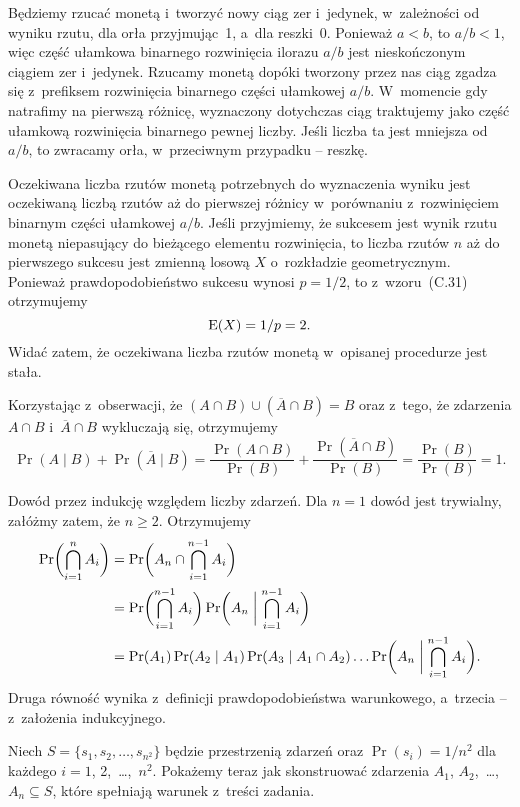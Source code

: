 \exercise{} %
Będziemy rzucać monetą i~tworzyć nowy ciąg zer i~jedynek, w~zależności od wyniku rzutu, dla orła przyjmując~1, a~dla reszki~0. Ponieważ $a<b$, to $a/b<1$, więc część ułamkowa binarnego rozwinięcia ilorazu $a/b$ jest nieskończonym ciągiem zer i~jedynek. Rzucamy monetą dopóki tworzony przez nas ciąg zgadza się z~prefiksem rozwinięcia binarnego części ułamkowej $a/b$. W~momencie gdy natrafimy na pierwszą różnicę, wyznaczony dotychczas ciąg traktujemy jako część ułamkową rozwinięcia binarnego pewnej liczby. Jeśli liczba ta jest mniejsza od $a/b$, to zwracamy orła, w~przeciwnym przypadku -- reszkę.

Oczekiwana liczba rzutów monetą potrzebnych do wyznaczenia wyniku jest oczekiwaną liczbą rzutów aż do pierwszej różnicy w~porównaniu z~rozwinięciem binarnym części ułamkowej $a/b$. Jeśli przyjmiemy, że sukcesem jest wynik rzutu monetą niepasujący do bieżącego elementu rozwinięcia, to liczba rzutów $n$ aż do pierwszego sukcesu jest zmienną losową $X$ o~rozkładzie geometrycznym. Ponieważ prawdopodobieństwo sukcesu wynosi $p=1/2$, to z~wzoru~(C.31) otrzymujemy
\[
	\operatorname{E}(X) = 1/p = 2.
\]
Widać zatem, że oczekiwana liczba rzutów monetą w~opisanej procedurze jest stała.

\exercise{} %
Korzystając z~obserwacji, że $(A\cap B)\cup(\overline{A}\cap B)=B$ oraz z~tego, że zdarzenia $A\cap B$ i~$\overline{A}\cap B$ wykluczają się, otrzymujemy
\[
	\Pr(A\mid B)+\Pr(\overline{A}\mid B) = \frac{\Pr(A\cap B)}{\Pr(B)}+\frac{\Pr(\overline{A}\cap B)}{\Pr(B)} = \frac{\Pr(B)}{\Pr(B)} = 1.
\]

\exercise{} %
Dowód przez indukcję względem liczby zdarzeń. Dla $n=1$ dowód jest trywialny, załóżmy zatem, że $n\ge2$. Otrzymujemy
\begin{align*}
	\Pr\biggl(\bigcap_{i=1}^nA_i\biggr) &= \Pr\biggl(A_n\cap\bigcap_{i=1}^{n-1}A_i\biggr) \\
	&= \Pr\biggl(\bigcap_{i=1}^{n-1}A_i\biggr)\Pr\biggl(A_n\biggm|\bigcap_{i=1}^{n-1}A_i\biggr) \\
	&= \Pr(A_1)\Pr(A_2\mid A_1)\Pr(A_3\mid A_1\cap A_2)\dots\Pr\biggl(A_n\biggm|\bigcap_{i=1}^{n-1}A_i\biggr).
\end{align*}
Druga równość wynika z~definicji prawdopodobieństwa warunkowego, a~trzecia -- z~założenia indukcyjnego.

\exercise{} %
Niech $S=\{s_1,s_2,\dots,s_{n^2}\}$ będzie przestrzenią zdarzeń oraz $\Pr(s_i)=1/n^2$ dla każdego $i=1$, 2,~\dots,~$n^2$. Pokażemy teraz jak skonstruować zdarzenia $A_1$, $A_2$,~\dots,~$A_n\subseteq S$, które spełniają warunek z~treści zadania.

